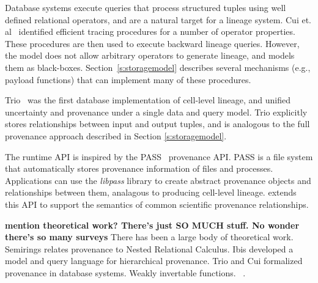 Database systems execute queries that process  structured tuples using 
 well defined relational operators, and are a natural target for a
lineage system.  Cui et. al~\cite{tracingcui} identified efficient
tracing procedures for a number of operator properties.  These procedures are
then used to execute backward lineage queries.  However, the model does not
allow arbitrary operators to generate lineage, and  models them as
black-boxes.  Section~\ref{s:storagemodel} describes several mechanisms (e.g.,
payload functions) that can implement many of these procedures.

Trio~\cite{trio} was the first database implementation of cell-level
lineage, and unified uncertainty and provenance under a single
data and query model.  Trio explicitly stores relationships between
input and output tuples, and is analogous to the full provenance
approach described in Section \ref{s:storagemodel}.

The \sys{} runtime API is inspired by the PASS~\cite{pass,passv2} provenance
API.  PASS is a file system that automatically stores provenance information of
files and processes.  Applications can use  the {\it libpass} library to create
abstract provenance objects and relationships between them, analagous to
producing cell-level lineage.  \sys{} extends this API to support the
semantics of common scientific provenance relationships. 



{\bf  mention theoretical work?  There's just SO MUCH stuff.  No
  wonder there's so many surveys}
There has been a large body of theoretical work. Semirings relates
provenance to Nested Relational Calculus.  Ibis developed a model and
query language for hierarchical provenance.  Trio and Cui formalized
provenance in database systems.  Weakly invertable functions.
~\cite{semirings,ibis,trio,weakinverse}.
\fi





